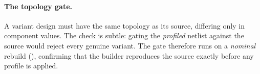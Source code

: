 \paragraph{The topology gate.} A variant design must have the same topology as
its source, differing only in component values. The check is subtle: gating the
\emph{profiled} netlist against the source would reject every genuine variant.
The gate therefore runs on a \emph{nominal} rebuild
(), confirming that the builder reproduces the
source exactly before any profile is applied.
